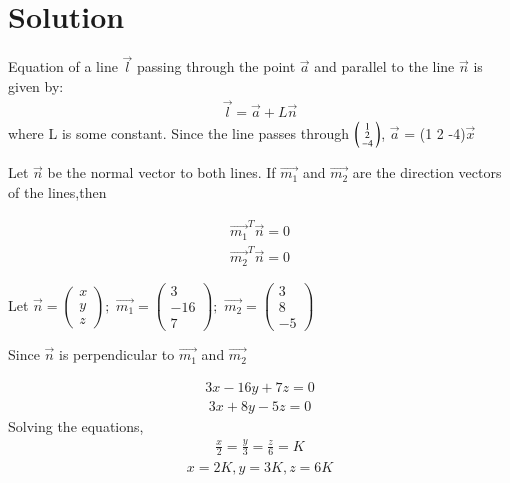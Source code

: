 \documentclass[journal,12pt,twocolumn]{IEEEtran}
\begin{document}
\section{Solution}
Equation of a line $\vec{l}$ passing through the point $\vec{a}$ and parallel to the line $\vec{n}$ is given by:
\begin{align}
 \vec{l} =\vec{a} + L\vec{n}   
\end{align}
where L is some constant.
Since the line passes through 
	$\begin{psmallmatrix}1 \\2\\-4\end{psmallmatrix} $,
$\vec{a}$ = (1  2 -4)$\vec{x}$
\begin{flushleft}
	Let $\vec{n}$ be the normal vector to both lines. If $\vec{m_1}$ and $\vec{m_2}$ are the direction vectors of the lines,then
\end{flushleft}
\begin{align}
 \vec{m_1}^T  \vec{n} = 0   
\end{align}
\begin{align}
\vec{m_2}^T\vec{n} = 0    
\end{align}

\begin{flushleft}
	Let 
	$\vec{n} =\begin{pmatrix} x\\ y\\ z\end{pmatrix} ;$
	$\vec{m_1} =\begin{pmatrix} 3 \\-16\\ 7\end{pmatrix}; $
	$\vec{m_2} =\begin{pmatrix} 3 \\ 8\\ -5\end{pmatrix} $
\end{flushleft}
\begin{flushleft}
	Since  $\vec{n}$ is perpendicular to $\vec{m_1}$ and $\vec{m_2}$
\end{flushleft}
\begin{align}
3x -16y + 7z = 0    
\end{align}
\begin{align}
3x + 8y - 5z = 0   
\end{align}
	Solving the equations,
\begin{align}
 	\frac{x}{2} = \frac{y}{3}= \frac{z}{6} = K   
\end{align}
\begin{align}
	x = 2K , y = 3K , z =6K    
\end{align}
\end{document}
